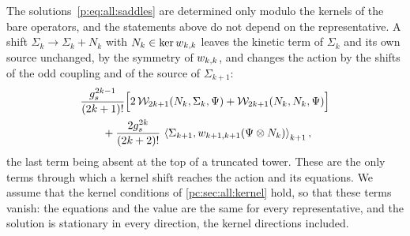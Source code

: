 The solutions~\eqref{p:eq:all:saddles} are determined only modulo the kernels of the bare operators, and the statements above do not depend on the representative.
A shift $\Sigma_k \to \Sigma_k + N_k$ with $N_k \in \ker \wprod{k}{k}$ leaves the kinetic term of $\Sigma_k$ and its own source unchanged, by the symmetry of $\wprod{k}{k}$, and changes the action by the shifts of the odd coupling and of the source of $\Sigma_{k + 1}$:
\begin{equation}
  \label{pc:eq:all:kernel-shift}
  \begin{aligned}
    &
    \frac{\gs^{2 k - 1}}{(2 k + 1)!} \Big[
      2 \, \dvertex{2 k + 1}(N_k, \Sigma_k, \Psi)
      + \dvertex{2 k + 1}(N_k, N_k, \Psi)
    \Big]
    \\ &
    \qquad
    + \frac{2 \gs^{2 k}}{(2 k + 2)!} \, \pair[k + 1]{\Sigma_{k + 1}}{\wprod{k + 1}{k + 1}(\Psi \otimes N_k)},
  \end{aligned}
\end{equation}
the last term being absent at the top of a truncated tower.
These are the only terms through which a kernel shift reaches the action and its equations.
We assume that the kernel conditions of \cref{pc:sec:all:kernel} hold, so that these terms vanish: the equations and the value are the same for every representative, and the solution is stationary in every direction, the kernel directions included.


